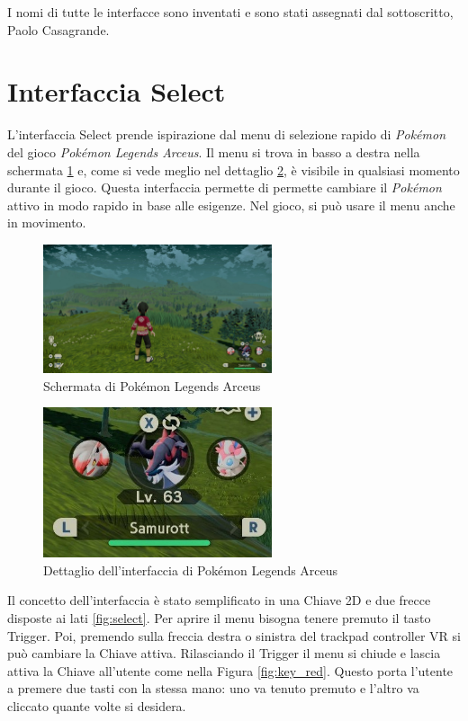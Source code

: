 \documentclass[target=bach,aauheader=]{thud}
\begin{document}
I nomi di tutte le interfacce sono inventati e sono stati assegnati dal sottoscritto, Paolo Casagrande.

\section{Interfaccia Select} %
\label{select}
L'interfaccia Select prende ispirazione dal menu di selezione rapido di \textit{Pokémon} del gioco \textit{Pokémon Legends Arceus}. 
Il menu si trova in basso a destra nella schermata \ref{fig:pok1} e, come si vede meglio nel dettaglio \ref{fig:pok2},  è visibile in qualsiasi momento durante il gioco.
Questa interfaccia permette di permette cambiare il \textit{Pokémon} attivo in modo rapido in base alle esigenze. 
Nel gioco, si può usare il menu anche in movimento.

\begin{figure}[h]
    \centering
    \includegraphics[width=0.60\textwidth]{pok1}
    \caption{Schermata di Pokémon Legends Arceus}
    \label{fig:pok1}
\end{figure}

\begin{figure}[h]
    \centering
    \includegraphics[width=0.60\textwidth]{pok2}
    \caption{Dettaglio dell'interfaccia di Pokémon Legends Arceus}
    \label{fig:pok2}
\end{figure}

Il concetto dell'interfaccia è stato semplificato in una Chiave 2D e due frecce disposte ai lati \ref{fig:select}.
Per aprire il menu bisogna tenere premuto il tasto Trigger.
Poi, premendo sulla freccia destra o sinistra del trackpad controller VR si può cambiare la Chiave attiva.
Rilasciando il Trigger il menu si chiude e lascia attiva la Chiave all'utente come nella Figura \ref{fig:key_red}.
Questo porta l'utente a premere due tasti con la stessa mano: uno va tenuto premuto e l'altro va cliccato quante volte si desidera. \\
\end{document}
